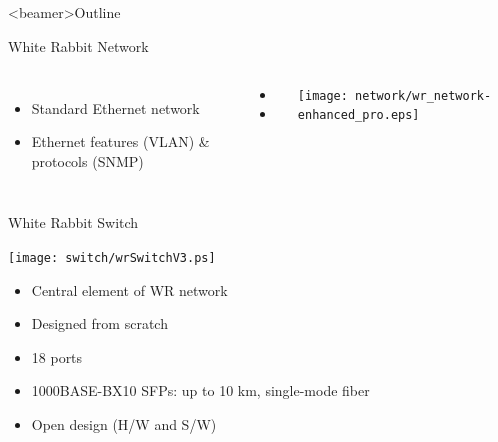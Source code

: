 \documentclass[compress,red]{beamer}
\begin{document}
\subsection{}
\begin{frame}<beamer>{Outline}
    \tableofcontents [currentsection]
\end{frame}

\begin{frame}{White Rabbit Network}


\begin{columns}[c]
 
  \begin{itemize}
      \item Standard Ethernet network
      \item Ethernet features (VLAN) \& protocols (SNMP)
    \end{itemize}
    \begin{itemize}
      \item \color{Blue}{High accuracy synchronization}
      \item \color{Red}{Reliable and low-latency Control Data}
  \end{itemize}

    \begin{center}
    \texttt{[image: network/wr\_network-enhanced\_pro.eps]}
    \end{center}
\end{columns}

\end{frame}

\begin{frame}{White Rabbit Switch }

    \begin{center}
    \texttt{[image: switch/wrSwitchV3.ps]}
    \end{center}

	\begin{itemize}
	\item Central element of WR network
	\item Designed from scratch
	\item 18 ports
	\item 1000BASE-BX10 SFPs: up to 10 km, single-mode fiber
	\item Open design (H/W and S/W)
	\end{itemize}
\end{frame}
\end{document}
